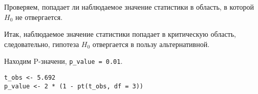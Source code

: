 \begin{problem}
\begin{sol}
\begin{enumerate}
Проверяем, попадает ли наблюдаемое значение статистики в область, в которой \(H_0\) не отвергается.

Итак, наблюдаемое значение статистики попадает в критическую область, следовательно, гипотеза \(H_0\) отвергается в пользу альтернативной.

Находим P-значени, \verb|p_value = 0.01|.
\begin{verbatim}
t_obs <- 5.692
p_value <- 2 * (1 - pt(t_obs, df = 3))
\end{verbatim}

\end{enumerate}
\end{sol}
\end{problem}



